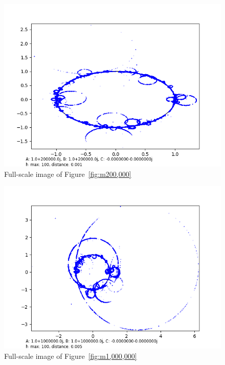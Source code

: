 \documentclass[12pt,a4paper,reqno,parskip=full]{amsart}
\numberwithin{equation}{section}
\theoremstyle{plain}
\theoremstyle{definition}
\begin{document}
\begin{figure}[H]
    \centering
    \includegraphics[width=\textwidth]{images/m/a200,000,b200,000,h100,d.0010.png}
    \caption{Full-scale image of Figure~\ref{fig:m200,000}}
\end{figure}

\begin{figure}[H]
    \centering
    \includegraphics[width=\textwidth]{images/m/a1,000,000,b1,000,000,h100,d.005.png}
    \caption{Full-scale image of Figure~\ref{fig:m1,000,000}}
\end{figure}
\end{document}
